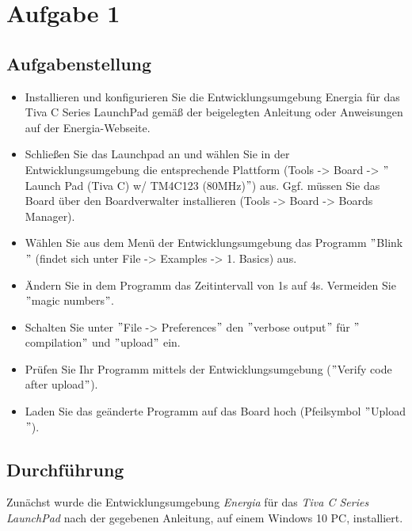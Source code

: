 \newpage
\section{Aufgabe 1}
\subsection{Aufgabenstellung}
\begin{itemize}
	\item Installieren und konfigurieren Sie die Entwicklungsumgebung Energia für das Tiva C Series LaunchPad gemä\ss{} der beigelegten Anleitung oder Anweisungen auf der Energia-Webseite.
	\item Schlie\ss{}en Sie das Launchpad an und wählen Sie in der Entwicklungsumgebung die entsprechende Plattform (Tools -> Board -> $"$Launch Pad (Tiva C) w/ TM4C123 (80MHz)$"$) aus. Ggf. müssen Sie das Board über den Boardverwalter installieren (Tools -> Board -> Boards Manager).
	\item Wählen Sie aus dem Menü der Entwicklungsumgebung das Programm $"$Blink$"$ (findet sich unter File -> Examples -> 1. Basics) aus.
	\item Ändern Sie in dem Programm das Zeitintervall von 1s auf 4s. Vermeiden Sie $"$magic numbers$"$.
	\item Schalten Sie unter $"$File -> Preferences$"$ den $"$verbose output$"$ für $"$compilation$"$ und $"$upload$"$ ein.
	\item Prüfen Sie Ihr Programm mittels der Entwicklungsumgebung ($"$Verify code after upload$"$).
	\item Laden Sie das geänderte Programm auf das Board hoch (Pfeilsymbol $"$Upload$"$).
\end{itemize}
\subsection{Durchführung}
Zunächst wurde die Entwicklungsumgebung \textit{Energia} für das \textit{Tiva C Series LaunchPad} nach der gegebenen Anleitung, auf einem Windows 10 PC, installiert.

